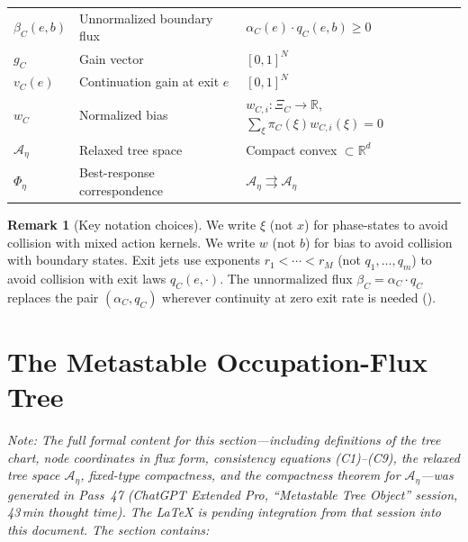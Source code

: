 \documentclass[12pt,a4paper]{article}
\theoremstyle{definition}
\newtheorem{remark}[theorem]{Remark}
\newcommand{\R}{\mathbb{R}}
\begin{document}
\begin{center}
\begin{tabular}{lll}
$\beta_C(e, b)$ & Unnormalized boundary flux & $\alpha_C(e) \cdot q_C(e, b) \geq 0$ \\
$g_C$ & Gain vector & $[0,1]^N$ \\
$v_C(e)$ & Continuation gain at exit $e$ & $[0,1]^N$ \\
$w_C$ & Normalized bias & $w_{C,i} \colon \Xi_C \to \R$, $\sum_\xi \pi_C(\xi) w_{C,i}(\xi) = 0$ \\
\midrule
$\mathcal{A}_\eta$ & Relaxed tree space & Compact convex $\subset \R^d$ \\
$\Phi_\eta$ & Best-response correspondence & $\mathcal{A}_\eta \rightrightarrows \mathcal{A}_\eta$ \\
\bottomrule
\end{tabular}
\end{center}

\begin{remark}[Key notation choices]
\label{rem:notation}
We write $\xi$ (not $x$) for phase-states to avoid collision with mixed action kernels.  We write $w$ (not $b$) for bias to avoid collision with boundary states.  Exit jets use exponents $r_1 < \cdots < r_M$ (not $q_1, \ldots, q_m$) to avoid collision with exit laws $q_C(e, \cdot)$.  The unnormalized flux $\beta_C = \alpha_C \cdot q_C$ replaces the pair $(\alpha_C, q_C)$ wherever continuity at zero exit rate is needed ().
\end{remark}

\section{The Metastable Occupation-Flux Tree}
\label{sec:tree}

\textit{Note: The full formal content for this section---including definitions of the tree chart, node coordinates in flux form, consistency equations \textnormal{(C1)--(C9)}, the relaxed tree space $\mathcal{A}_\eta$, fixed-type compactness, and the compactness theorem for $\mathcal{A}_\eta$---was generated in Pass~47 (ChatGPT Extended Pro, ``Metastable Tree Object'' session, 43\,min thought time).  The LaTeX is pending integration from that session into this document.  The section contains:}
\end{document}
